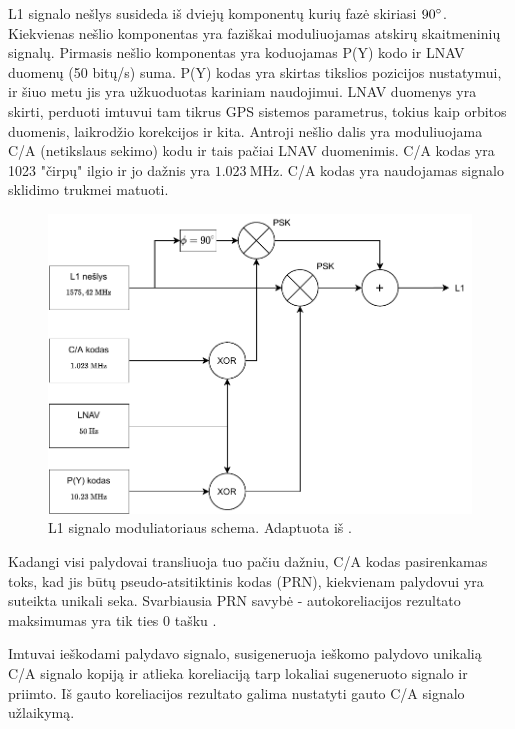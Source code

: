 \documentclass[main.tex]{subfiles}
\begin{document}
L1 signalo nešlys susideda iš dviejų komponentų kurių fazė skiriasi $90\degree$.
Kiekvienas nešlio komponentas yra faziškai moduliuojamas atskirų skaitmeninių signalų.
Pirmasis nešlio komponentas yra koduojamas P(Y) kodo ir LNAV duomenų (50 bitų/s) suma.
P(Y) kodas yra skirtas tikslios pozicijos nustatymui, ir šiuo metu jis yra užkuoduotas
kariniam naudojimui.
LNAV duomenys yra skirti, perduoti imtuvui tam tikrus GPS sistemos parametrus, tokius
kaip orbitos duomenis, laikrodžio korekcijos ir kita.
Antroji nešlio dalis yra moduliuojama C/A (netikslaus sekimo) kodu ir tais pačiai LNAV
duomenimis. C/A kodas yra 1023 "čirpų" ilgio ir jo dažnis yra $1.023\ \mathrm{MHz}$.
C/A kodas yra naudojamas signalo sklidimo trukmei matuoti.

\begin{figure}[h]
    \begin{centering}
    \includegraphics[scale=0.85]{drawings/l1_signal}
    \par\end{centering}
    \protect\caption{\label{fig:l1_signal}L1 signalo moduliatoriaus schema. Adaptuota iš \cite{Sadeghi2008TimeSS}.}
\end{figure}

Kadangi visi palydovai transliuoja tuo pačiu dažniu, C/A kodas pasirenkamas toks,
kad jis būtų pseudo-atsitiktinis kodas (PRN), kiekvienam palydovui yra suteikta unikali seka.
Svarbiausia PRN savybė - autokoreliacijos rezultato maksimumas yra tik
ties 0 tašku \cite{OCHIN202121_chapter2}.

Imtuvai ieškodami palydavo signalo, susigeneruoja ieškomo palydovo unikalią C/A signalo
kopiją ir atlieka koreliaciją tarp lokaliai sugeneruoto signalo ir priimto.
Iš gauto koreliacijos rezultato galima nustatyti gauto C/A signalo užlaikymą.
\end{document}
